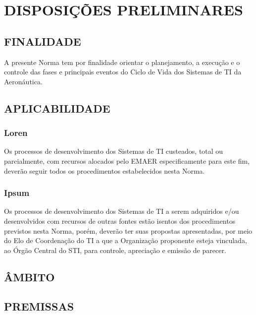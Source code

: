 \chapter{DISPOSIÇÕES PRELIMINARES}

    \section{FINALIDADE}
    
        A presente Norma tem por finalidade orientar o planejamento, a execução e o controle das fases e principais eventos do Ciclo de Vida dos Sistemas de TI da Aeronáutica.
    
    \section{APLICABILIDADE}
    
        \subsection{Loren}
            
            Os processos de desenvolvimento dos Sistemas de TI custeados, total ou parcialmente, com recursos alocados pelo EMAER especificamente para este fim, deverão seguir todos os procedimentos estabelecidos nesta Norma.
            
        \subsection{Ipsum}
        
            Os processos de desenvolvimento dos Sistemas de TI a serem adquiridos e/ou desenvolvidos com recursos de outras fontes estão isentos dos procedimentos previstos nesta Norma, porém, deverão ter suas propostas apresentadas, por meio do Elo de Coordenação do TI a que a Organização proponente esteja vinculada, ao Órgão Central do STI, para controle, apreciação e emissão de parecer.
    
    
    \section{ÂMBITO}
    
        \lipsum[1-7]
    
    \section{PREMISSAS}




